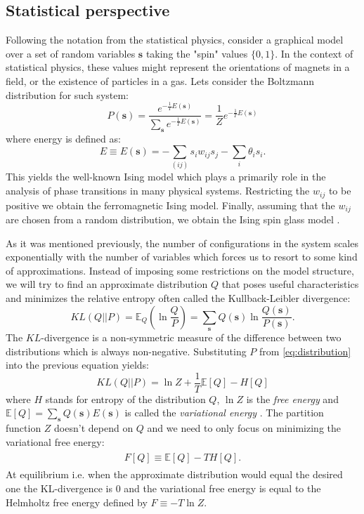 \documentclass[../report/report.tex]{subfiles}
\begin{document}
\subsection{Statistical perspective}
Following the notation from the statistical physics, consider a graphical model over a set of random variables $\mathbf{s}$ taking the "spin" values $\{0, 1 \}$. In the context of statistical physics, these values might represent the orientations of magnets in a field, or the existence of particles in a gas. Lets consider the Boltzmann distribution for such system:
\begin{equation}
P(\mathbf{s}) = \frac{ e^{-\frac{1}{T}E(\mathbf{s})}}{\sum_{\mathbf{s}} e^{-\frac{1}{T}E(\mathbf{s})}} = \frac{1}{Z}e^{-\frac{1}{T}E(\mathbf{s})}
\label{eq:distribution}
\end{equation}
where energy is defined as:
$$E \equiv E (\mathbf{s}) = - \sum_{(ij)} s_i w_{ij} s_j - \sum_i \theta_i s_i.$$
This yields the well-known Ising model which plays a primarily role in the analysis of phase transitions in many physical systems. Restricting the $w_{ij}$ to be positive we obtain the ferromagnetic Ising model. Finally, assuming that the $w_{ij}$ are chosen from a random distribution, we obtain the Ising spin glass model \cite{yedidia2001idiosyncratic}. 

As it was mentioned previously, the number of configurations in the system scales exponentially with the number of variables which forces us to resort to some kind of approximations. Instead of imposing some restrictions on the model structure, we will try to find an approximate distribution $Q$ that poses useful characteristics and minimizes the relative entropy often called the Kullback-Leibler divergence:
\begin{equation}
KL(Q || P)  = \mathbb{E}_{Q}\left( \ln \frac{Q}{P} \right) = \sum_{\mathbf{s}} Q(\mathbf{s}) \ln \frac{Q(\mathbf{s})}{P(\mathbf{s})} .
\label{eq:kl}
\end{equation}
The $KL$-divergence is a non-symmetric measure of the difference between two distributions which is always non-negative. Substituting $P$ from \ref{eq:distribution} into the previous equation yields:
$$ KL(Q||P) = \ln Z + \frac{1}{T}\mathbb{E}[Q] - H[Q]$$
where $H$ stands for entropy of the distribution $Q$, $\ln Z$ is the \emph{free energy} and $\mathbb{E}[Q] = \sum_{\mathbf{s}} Q(\mathbf{s})E(\mathbf{s})$ is called the \emph{variational energy} \cite{opper2001advanced}. The partition function $Z$ doesn't depend on $Q$ and we need to only focus on minimizing the variational free energy:
\begin{align}
\begin{split}
F[Q] \equiv \mathbb{E}[Q] - TH[Q].
\label{eq:gibbsFreeEnergy}
\end{split}
\end{align}
At equilibrium i.e. when the approximate distribution would equal the desired one the KL-divergence is $0$ and the variational free energy is equal to the Helmholtz free energy defined by 
$F \equiv -T \ln Z$. 
\end{document}
